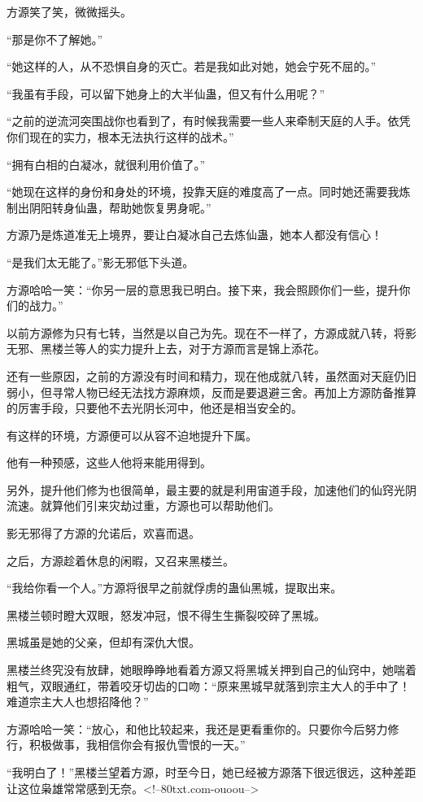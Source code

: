 \begin{this_body}
方源笑了笑，微微摇头。

“那是你不了解她。”

“她这样的人，从不恐惧自身的灭亡。若是我如此对她，她会宁死不屈的。”

“我虽有手段，可以留下她身上的大半仙蛊，但又有什么用呢？”

“之前的逆流河突围战你也看到了，有时候我需要一些人来牵制天庭的人手。依凭你们现在的实力，根本无法执行这样的战术。”

“拥有白相的白凝冰，就很利用价值了。”

“她现在这样的身份和身处的环境，投靠天庭的难度高了一点。同时她还需要我炼制出阴阳转身仙蛊，帮助她恢复男身呢。”

方源乃是炼道准无上境界，要让白凝冰自己去炼仙蛊，她本人都没有信心！

“是我们太无能了。”影无邪低下头道。

方源哈哈一笑：“你另一层的意思我已明白。接下来，我会照顾你们一些，提升你们的战力。”

以前方源修为只有七转，当然是以自己为先。现在不一样了，方源成就八转，将影无邪、黑楼兰等人的实力提升上去，对于方源而言是锦上添花。

还有一些原因，之前的方源没有时间和精力，现在他成就八转，虽然面对天庭仍旧弱小，但寻常人物已经无法找方源麻烦，反而是要退避三舍。再加上方源防备推算的厉害手段，只要他不去光阴长河中，他还是相当安全的。

有这样的环境，方源便可以从容不迫地提升下属。

他有一种预感，这些人他将来能用得到。

另外，提升他们修为也很简单，最主要的就是利用宙道手段，加速他们的仙窍光阴流速。就算他们引来灾劫过重，方源也可以帮助他们。

影无邪得了方源的允诺后，欢喜而退。

之后，方源趁着休息的闲暇，又召来黑楼兰。

“我给你看一个人。”方源将很早之前就俘虏的蛊仙黑城，提取出来。

黑楼兰顿时瞪大双眼，怒发冲冠，恨不得生生撕裂咬碎了黑城。

黑城虽是她的父亲，但却有深仇大恨。

黑楼兰终究没有放肆，她眼睁睁地看着方源又将黑城关押到自己的仙窍中，她喘着粗气，双眼通红，带着咬牙切齿的口吻：“原来黑城早就落到宗主大人的手中了！难道宗主大人也想招降他？”

方源哈哈一笑：“放心，和他比较起来，我还是更看重你的。只要你今后努力修行，积极做事，我相信你会有报仇雪恨的一天。”

“我明白了！”黑楼兰望着方源，时至今日，她已经被方源落下很远很远，这种差距让这位枭雄常常感到无奈。<!--80txt.com-ouoou-->

\end{this_body}

